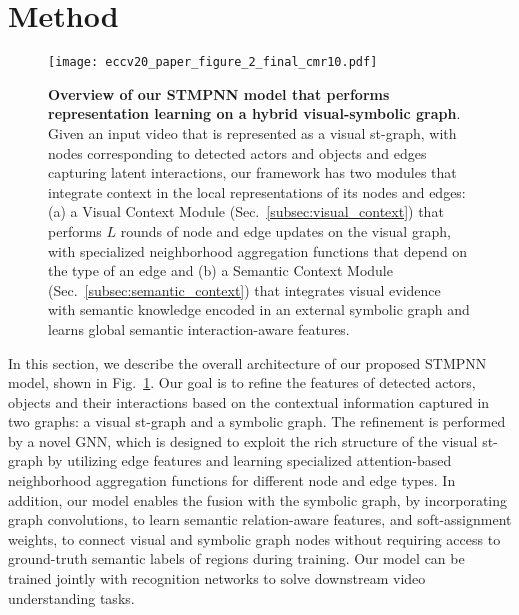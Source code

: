 \documentclass[runningheads]{llncs}
\begin{document}
\section{Method}
\label{sec:method}
\begin{figure}[ht]
\begin{center}
 \texttt{[image: eccv20\_paper\_figure\_2\_final\_cmr10.pdf]}
\end{center}
   \caption{\textbf{Overview of our \ac{STMPNN} model that performs representation learning on a hybrid visual-symbolic graph}. Given an input video that is represented as a visual st-graph, with nodes corresponding to detected actors and objects and edges capturing latent interactions, our framework has two modules that integrate context in the local representations of its nodes and edges: (a) a Visual Context Module (Sec.~\ref{subsec:visual_context}) that performs $L$ rounds of node and edge updates on the visual graph, with specialized neighborhood aggregation functions that depend on the type of an edge and (b) a Semantic Context Module (Sec.~\ref{subsec:semantic_context}) that integrates visual evidence with semantic knowledge encoded in an external symbolic graph and learns global semantic interaction-aware features.
}
\label{fig:overview}
\end{figure}
In this section, we describe the overall architecture of our proposed \ac{STMPNN} model, shown in Fig.~\ref{fig:overview}. Our goal is to refine the features of detected actors, objects and their interactions based on the contextual information captured in two graphs: a visual st-graph
and a symbolic graph. The refinement is performed by a novel GNN, which is designed to exploit the rich structure of the visual st-graph by utilizing edge features and learning specialized attention-based neighborhood aggregation functions for different node and edge types.  In addition, our model enables the fusion with the symbolic graph, by incorporating graph convolutions, to learn semantic relation-aware features, and soft-assignment weights, to connect visual and symbolic graph nodes without requiring access to ground-truth semantic labels of regions during training. Our model can be trained jointly with recognition networks to solve downstream video understanding tasks.
\end{document}

